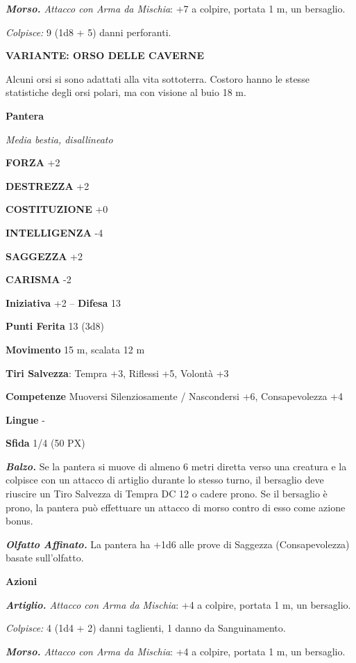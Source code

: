 \begin{multicols}{2}
	\textit{\textbf{Morso.} Attacco con Arma da Mischia}: +7 a colpire, portata 1 m, un bersaglio.

	\textit{Colpisce:} 9 (1d8 + 5) danni perforanti.

	\textbf{VARIANTE: ORSO DELLE CAVERNE}

	Alcuni orsi si sono adattati alla vita sottoterra. Costoro hanno le stesse statistiche degli orsi polari, ma con visione al buio 18 m.

	\medskip\textbf{Pantera}

	\textit{Media bestia, disallineato}

	\textbf{FORZA} +2

	\textbf{DESTREZZA} +2

	\textbf{COSTITUZIONE} +0

	\textbf{INTELLIGENZA} -4

	\textbf{SAGGEZZA} +2

	\textbf{CARISMA} -2

	\textbf{Iniziativa} +2 -- \textbf{Difesa} 13

	\textbf{Punti Ferita} 13 (3d8)

	\textbf{Movimento} 15 m, scalata 12 m

	\textbf{Tiri Salvezza}: Tempra +3, Riflessi +5, Volontà +3

	\textbf{Competenze} Muoversi Silenziosamente / Nascondersi +6, Consapevolezza +4

	\textbf{Lingue} -

	\textbf{Sfida} 1/4 (50 PX)

	\textit{\textbf{Balzo.}} Se la pantera si muove di almeno 6 metri diretta verso una creatura e la colpisce con un attacco di artiglio durante lo stesso turno, il bersaglio deve riuscire un Tiro Salvezza di Tempra DC 12 o cadere prono. Se il bersaglio è prono, la pantera può effettuare un attacco di morso contro di esso come azione bonus.

	\textit{\textbf{Olfatto Affinato.}} La pantera ha +1d6 alle prove di Saggezza (Consapevolezza) basate sull'olfatto.

	\textbf{Azioni}

	\textit{\textbf{Artiglio.} Attacco con Arma da Mischia}: +4 a colpire, portata 1 m, un bersaglio.

	\textit{Colpisce:} 4 (1d4 + 2) danni taglienti, 1 danno da Sanguinamento.

	\textit{\textbf{Morso.} Attacco con Arma da Mischia}: +4 a colpire, portata 1 m, un bersaglio.


\end{multicols}
